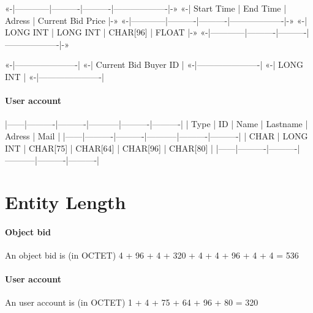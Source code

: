    «-|------------|----------|----------|-------------------|-»
   «-| Start Time | End Time |  Adress  | Current Bid Price |-»
   «-|------------|----------|----------|-------------------|-»
   «-|  LONG INT  | LONG INT | CHAR[96] |       FLOAT       |-»
   «-|------------|----------|----------|-------------------|-»

   «-|----------------------|
   «-| Current Bid Buyer ID |
   «-|----------------------|
   «-|       LONG INT       |
   «-|----------------------|
        \paragraph{User account}
   |------|----------|----------|-----------|----------|----------|
   | Type |    ID    |   Name   |  Lastname |  Adress  |   Mail   |
   |------|----------|----------|-----------|----------|----------|
   | CHAR | LONG INT | CHAR[75] |  CHAR[64] | CHAR[96] | CHAR[80] |
   |------|----------|----------|-----------|----------|----------|
    \section{Entity Length}
        \paragraph{Object bid}
   An object bid is (in OCTET)
   4 + 96 + 4 + 320 + 4 + 4 + 96 + 4 + 4 = 536
        \paragraph{User account}
   An user account is (in OCTET)
   1 + 4 + 75 + 64 + 96 + 80 = 320

